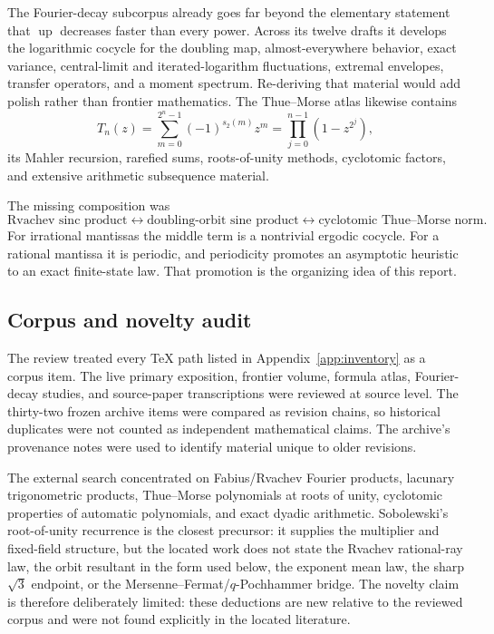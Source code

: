 \documentclass[11pt,oneside]{article}
\theoremstyle{definition}
\theoremstyle{remark}
\newcommand{\Up}{\operatorname{up}}
\newcommand{\wt}{s_2}
\begin{document}
The Fourier-decay subcorpus already goes far beyond the elementary statement that
$\widehat{\Up}$ decreases faster than every power. Across its twelve drafts it
develops the logarithmic cocycle for the doubling map, almost-everywhere behavior,
exact variance, central-limit and iterated-logarithm fluctuations, extremal
envelopes, transfer operators, and a moment spectrum. Re-deriving that material
would add polish rather than frontier mathematics. The Thue--Morse atlas likewise
contains
\[
 T_n(z)=\sum_{m=0}^{2^n-1}(-1)^{\wt(m)}z^m
       =\prod_{j=0}^{n-1}(1-z^{2^j}),
\]
its Mahler recursion, rarefied sums, roots-of-unity methods, cyclotomic factors,
and extensive arithmetic subsequence material.

The missing composition was
\[
 \text{Rvachev sinc product}
 \longleftrightarrow
 \text{doubling-orbit sine product}
 \longleftrightarrow
 \text{cyclotomic Thue--Morse norm}.
\]
For irrational mantissas the middle term is a nontrivial ergodic cocycle. For a
rational mantissa it is periodic, and periodicity promotes an asymptotic heuristic
to an exact finite-state law. That promotion is the organizing idea of this report.

\subsection{Corpus and novelty audit}

The review treated every TeX path listed in Appendix~\ref{app:inventory} as a corpus
item. The live primary exposition, frontier volume, formula atlas, Fourier-decay
studies, and source-paper transcriptions were reviewed at source level. The
thirty-two frozen archive items were compared as revision chains, so historical
duplicates were not counted as independent mathematical claims. The archive's
provenance notes were used to identify material unique to older revisions.

The external search concentrated on Fabius/Rvachev Fourier products, lacunary
trigonometric products, Thue--Morse polynomials at roots of unity, cyclotomic
properties of automatic polynomials, and exact dyadic arithmetic. Sobolewski's
root-of-unity recurrence is the closest precursor: it supplies the multiplier and
fixed-field structure, but the located work does not state the Rvachev rational-ray
law, the orbit resultant in the form used below, the exponent mean law, the sharp
$\sqrt3$ endpoint, or the Mersenne--Fermat/$q$-Pochhammer bridge. The novelty claim
is therefore deliberately limited: these deductions are new relative to the
reviewed corpus and were not found explicitly in the located literature.
\end{document}
